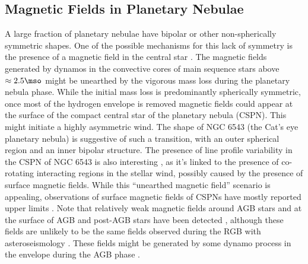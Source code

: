 \subsection{Magnetic Fields in Planetary Nebulae}
A large fraction of planetary nebulae have bipolar or other non-spherically symmetric shapes. 
One of the possible mechanisms for this lack of symmetry is the presence of a magnetic field in the central star \citep[See e.g.][]{Garc_a_Segura_1997,Chevalier_1994}. The magnetic fields generated by dynamos in the convective cores of main sequence stars above $\approx 2.5\mso$ might be unearthed by the vigorous mass loss during the planetary nebula phase. While the initial mass loss is predominantly spherically symmetric, once most of the hydrogen envelope is removed magnetic fields could appear at the surface of the compact central star of the planetary nebula (CSPN). This might initiate a highly asymmetric wind. The shape of NGC 6543 (the Cat's eye planetary nebula) is suggestive of such a transition, with an outer spherical region and an inner bipolar structure. The presence of line profile variability in the CSPN of NGC 6543 is also interesting \cite{Prinja_2012}, as it's linked to the presence of co-rotating interacting regions in the stellar wind, possibly caused by the presence of surface magnetic fields. While this ``unearthed magnetic field'' scenario is appealing, observations of surface magnetic fields of CSPNs have mostly reported upper limits \citep{Jordan_2012,Leone_2014,Asensio_Ramos_2014}. Note that relatively weak  magnetic fields around AGB stars \cite{Leal_Ferreira_2013} and at the surface of AGB and post-AGB stars have been detected \cite{L_bre_2014,Sabin_2014}, although these fields are unlikely to be the same fields observed during the RGB with asteroseismology \citep{Fuller_2015}. These fields might be generated by some dynamo process in the envelope during the AGB phase \citep[e.g.][]{Nordhaus_2007}.


